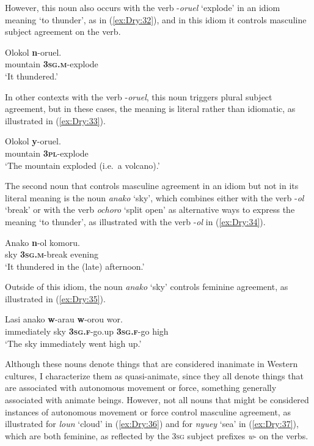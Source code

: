 \documentclass[output=collectionpaper]{langsci/langscibook}
\begin{document}
However, this noun also occurs with the verb -\textit{oruel} `explode' in an idiom meaning `to thunder', as in (\ref{ex:Dry:32}), and in this idiom it controls masculine subject agreement on the verb.

\ea \label{ex:Dry:32}
\gll Olokol	\textbf{n}-oruel.\\
mountain \textbf{\textsc{3sg.m}}-explode\\
\glt `It thundered.'
\z

In other contexts with the verb -\textit{oruel}, this noun triggers plural subject agreement, but in these cases, the meaning is literal rather than idiomatic, as illustrated in (\ref{ex:Dry:33}).

\ea \label{ex:Dry:33}
\gll Olokol	\textbf{y}-oruel.\\
mountain \textbf{\textsc{3pl}}-explode\\
\glt `The mountain exploded (i.e.\ a volcano).'
\z

The second noun that controls masculine agreement in an idiom but not in its literal meaning is the noun \textit{anako} `sky', which combines either with the verb -\textit{ol} `break' or with the verb \textit{ochoro} `split open' as alternative ways to express the meaning `to thunder', as illustrated with the verb -\textit{ol} in (\ref{ex:Dry:34}).

\ea \label{ex:Dry:34}
\gll Anako	\textbf{n}-ol	komoru.\\
sky \textbf{\textsc{3sg.m}}-break evening\\
\glt `It thundered in the (late) afternoon.'
\z

Outside of this idiom, the noun \textit{anako} `sky' controls feminine agreement, as illustrated in (\ref{ex:Dry:35}).

\ea \label{ex:Dry:35}
\gll Lasi	anako	\textbf{w}-arau	\textbf{w}-orou	wor.\\
immediately sky \textbf{\textsc{3sg.f}}-go.up \textbf{\textsc{3sg.f}}-go high\\
\glt `The sky immediately went high up.'
\z

Although these nouns denote things that are considered inanimate in Western cultures, I characterize them as quasi-animate, since they all denote things that are associated with autonomous movement or force, something generally associated with animate beings. However, not all nouns that might be considered instances of autonomous movement or force control masculine agreement, as illustrated for \textit{loun} `cloud' in (\ref{ex:Dry:36}) and for \textit{nyuey} `sea' in (\ref{ex:Dry:37}), which are both feminine, as reflected by the \textsc{3sg} subject prefixes \textit{w}{}- on the verbs.
\end{document}
